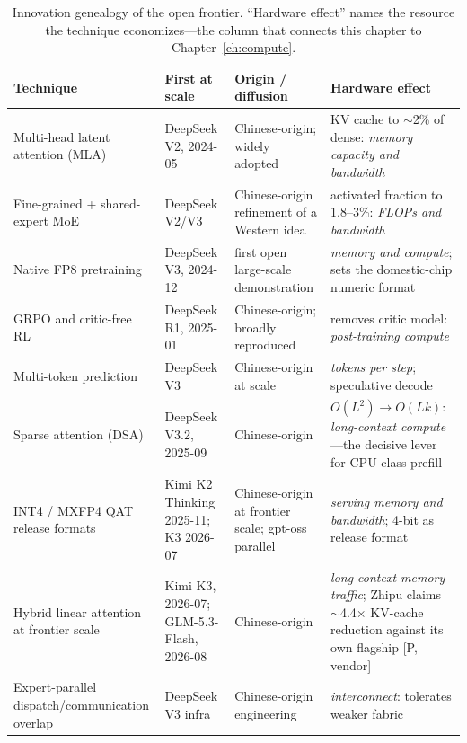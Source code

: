 \begin{table}[htbp]
  \centering
  \scriptsize
  \caption{Innovation genealogy of the open frontier. ``Hardware effect'' names the resource the technique economizes---the column that connects this chapter to Chapter~\ref{ch:compute}.}
  \label{tab:genealogy}
  \begin{tabular}{p{31mm}p{20mm}p{34mm}p{48mm}}
    \toprule
    Technique & First at scale & Origin / diffusion & Hardware effect \\
    \midrule
    Multi-head latent attention (MLA) & DeepSeek V2, 2024-05 & Chinese-origin; widely adopted & KV cache to $\sim$2\% of dense: \emph{memory capacity and bandwidth} \\
    \addlinespace
    Fine-grained + shared-expert MoE & DeepSeek V2/V3 & Chinese-origin refinement of a Western idea & activated fraction to 1.8--3\%: \emph{FLOPs and bandwidth} \\
    \addlinespace
    Native FP8 pretraining & DeepSeek V3, 2024-12 & first open large-scale demonstration & \emph{memory and compute}; sets the domestic-chip numeric format \\
    \addlinespace
    GRPO and critic-free RL & DeepSeek R1, 2025-01 & Chinese-origin; broadly reproduced & removes critic model: \emph{post-training compute} \\
    \addlinespace
    Multi-token prediction & DeepSeek V3 & Chinese-origin at scale & \emph{tokens per step}; speculative decode \\
    \addlinespace
    Sparse attention (DSA) & DeepSeek V3.2, 2025-09 & Chinese-origin & $O(L^2)\!\to\!O(Lk)$: \emph{long-context compute}---the decisive lever for CPU-class prefill \\
    \addlinespace
    INT4 / MXFP4 QAT release formats & Kimi K2 Thinking 2025-11; K3 2026-07 & Chinese-origin at frontier scale; gpt-oss parallel & \emph{serving memory and bandwidth}; 4-bit as release format \\
    \addlinespace
    Hybrid linear attention at frontier scale & Kimi K3, 2026-07; GLM-5.3-Flash, 2026-08 & Chinese-origin & \emph{long-context memory traffic}; Zhipu claims $\sim$4.4$\times$ KV-cache reduction against its own flagship [P, vendor] \\
    \addlinespace
    Expert-parallel dispatch/communication overlap & DeepSeek V3 infra & Chinese-origin engineering & \emph{interconnect}: tolerates weaker fabric \\
    \bottomrule
  \end{tabular}
\end{table}

